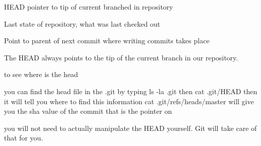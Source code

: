 HEAD 
  pointer to tip of current branched in repository 

  Last state of repository, what was last checked out 

  Point to parent of next commit where writing commits takes place 

  The HEAD always points to the tip of the current branch in our repository.

to see where is the head 

you can find the head file in the .git by typing 
ls -la .git 
then 
cat .git/HEAD
then it will tell you where to find this information
cat .git/refs/heads/master 
will give you the sha value of the commit that is the pointer on 

you will not need to actually manipulate the HEAD yourself. Git will take care of that for you. 